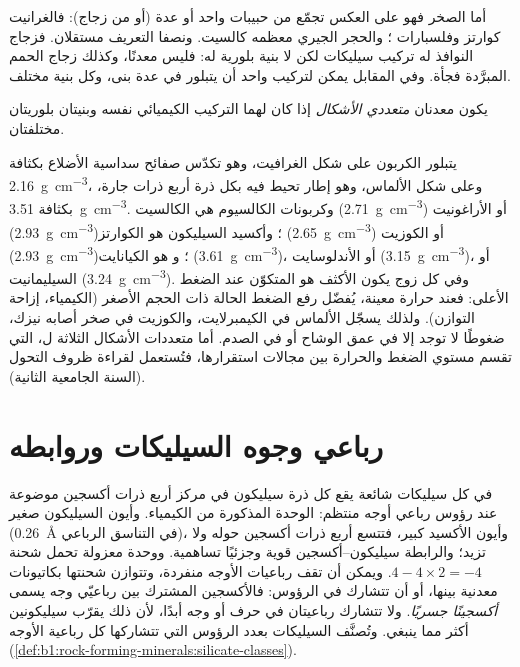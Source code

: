 أما الصخر فهو على العكس تجمّع من حبيبات  واحد أو عدة  (أو من زجاج): فالغرانيت كوارتز وفلسبارات ؛ والحجر الجيري معظمه كالسيت. ونصفا التعريف مستقلان. فزجاج النوافذ له تركيب سيليكات لكن لا بنية بلورية له: فليس معدنًا، وكذلك زجاج الحمم المبرَّدة فجأة. وفي المقابل يمكن لتركيب واحد أن يتبلور في عدة بنى، وكل بنية  مختلف.

\begin{definition}\label{def:b1:rock-forming-minerals:polymorph}
يكون معدنان \emph{متعددي الأشكال} إذا كان لهما التركيب الكيميائي نفسه وبنيتان بلوريتان مختلفتان.
\end{definition}

يتبلور الكربون على شكل الغرافيت، وهو تكدّس صفائح سداسية الأضلاع بكثافة \qty{2.16}{g.cm^{-3}}، وعلى شكل الألماس، وهو إطار تحيط فيه بكل ذرة أربع ذرات جارة، بكثافة \qty{3.51}{g.cm^{-3}}. وكربونات الكالسيوم هي الكالسيت (\qty{2.71}{g.cm^{-3}}) أو الأراغونيت (\qty{2.93}{g.cm^{-3}})؛ وأكسيد السيليكون هو الكوارتز (\qty{2.65}{g.cm^{-3}}) أو الكوزيت (\qty{2.93}{g.cm^{-3}})؛ و هو الكيانايت (\qty{3.61}{g.cm^{-3}})، أو الأندلوسايت (\qty{3.15}{g.cm^{-3}})، أو السيليمانيت (\qty{3.24}{g.cm^{-3}}).
وفي كل زوج يكون  الأكثف هو المتكوّن عند الضغط الأعلى: فعند حرارة معينة، يُفضّل رفع الضغط الحالة ذات الحجم الأصغر (الكيمياء، إزاحة التوازن). ولذلك يسجّل الألماس في الكيمبرلايت، والكوزيت في صخر أصابه نيزك، ضغوطًا لا توجد إلا في عمق الوشاح أو في الصدم. أما متعددات الأشكال الثلاثة ل، التي تقسم مستوي الضغط والحرارة بين مجالات استقرارها، فتُستعمل لقراءة ظروف التحول (السنة الجامعية الثانية).

\section{رباعي وجوه السيليكات وروابطه}

في كل سيليكات شائعة يقع كل ذرة سيليكون في مركز أربع ذرات أكسجين موضوعة عند رؤوس رباعي أوجه منتظم: الوحدة  المذكورة من الكيمياء. وأيون السيليكون صغير (\qty{0.26}{\angstrom} في التناسق الرباعي)، وأيون الأكسيد كبير، فتتسع أربع ذرات أكسجين حوله ولا تزيد؛ والرابطة سيليكون–أكسجين قوية وجزئيًا تساهمية. ووحدة معزولة تحمل شحنة $4 - 4\times2 = -4$.
ويمكن أن تقف رباعيات الأوجه منفردة، وتتوازن شحنتها بكاتيونات معدنية بينها، أو أن تتشارك في الرؤوس: فالأكسجين المشترك بين رباعيّي وجه يسمى \emph{أكسجينًا جسريًا}. ولا تتشارك رباعيتان في حرف أو وجه أبدًا، لأن ذلك يقرّب سيليكونين أكثر مما ينبغي. وتُصنَّف السيليكات بعدد الرؤوس التي تتشاركها كل رباعية الأوجه (\cref{def:b1:rock-forming-minerals:silicate-classes}).

